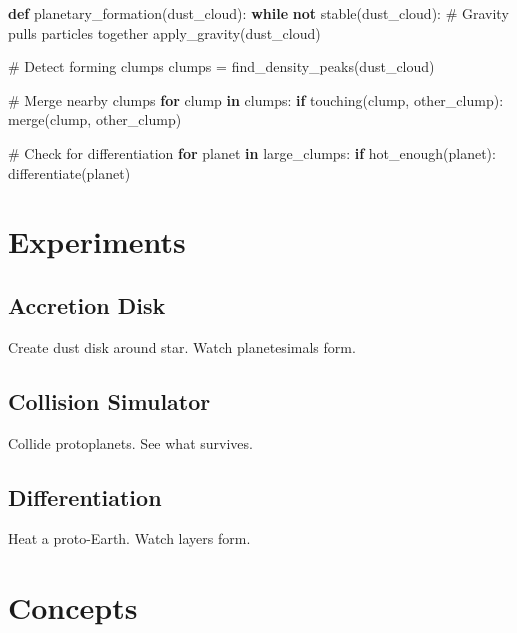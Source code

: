\documentclass[
  11pt,
  letterpaper,
  twoside,
  openright]{book}
\newenvironment{Shaded}{\begin{snugshade}}{\end{snugshade}}
\newcommand{\CommentTok}[1]{\textcolor[rgb]{0.37,0.37,0.37}{#1}}
\newcommand{\ControlFlowTok}[1]{\textcolor[rgb]{0.00,0.23,0.31}{\textbf{#1}}}
\newcommand{\KeywordTok}[1]{\textcolor[rgb]{0.00,0.23,0.31}{\textbf{#1}}}
\newcommand{\NormalTok}[1]{\textcolor[rgb]{0.00,0.23,0.31}{#1}}
\newcommand{\OperatorTok}[1]{\textcolor[rgb]{0.37,0.37,0.37}{#1}}
\begin{document}
\begin{Shaded}
\begin{Highlighting}[]
\KeywordTok{def}\NormalTok{ planetary\_formation(dust\_cloud):}
    \ControlFlowTok{while} \KeywordTok{not}\NormalTok{ stable(dust\_cloud):}
        \CommentTok{\# Gravity pulls particles together}
\NormalTok{        apply\_gravity(dust\_cloud)}

        \CommentTok{\# Detect forming clumps}
\NormalTok{        clumps }\OperatorTok{=}\NormalTok{ find\_density\_peaks(dust\_cloud)}

        \CommentTok{\# Merge nearby clumps}
        \ControlFlowTok{for}\NormalTok{ clump }\KeywordTok{in}\NormalTok{ clumps:}
            \ControlFlowTok{if}\NormalTok{ touching(clump, other\_clump):}
\NormalTok{                merge(clump, other\_clump)}

        \CommentTok{\# Check for differentiation}
        \ControlFlowTok{for}\NormalTok{ planet }\KeywordTok{in}\NormalTok{ large\_clumps:}
            \ControlFlowTok{if}\NormalTok{ hot\_enough(planet):}
\NormalTok{                differentiate(planet)}
\end{Highlighting}
\end{Shaded}

\section{Experiments}\label{experiments-15}

\subsection{Accretion Disk}\label{accretion-disk}

Create dust disk around star. Watch planetesimals form.

\subsection{Collision Simulator}\label{collision-simulator}

Collide protoplanets. See what survives.

\subsection{Differentiation}\label{differentiation-1}

Heat a proto-Earth. Watch layers form.

\section{Concepts}\label{concepts-15}
\end{document}
